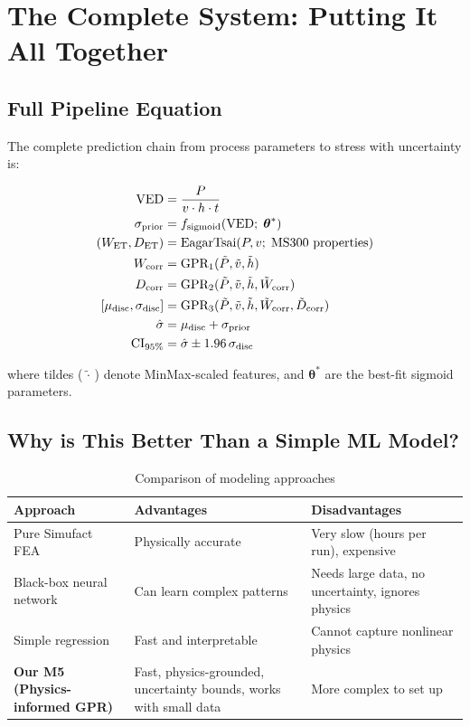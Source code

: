 \documentclass[12pt,a4paper]{report}
\begin{document}
\chapter{The Complete System: Putting It All Together}

\section{Full Pipeline Equation}

The complete prediction chain from process parameters to stress with uncertainty is:

\begin{align}
\text{VED} &= \frac{P}{v \cdot h \cdot t} \notag\\
\sigma_{\text{prior}} &= f_{\text{sigmoid}}(\text{VED};\; \boldsymbol{\theta}^*) \notag\\
(W_{\text{ET}}, D_{\text{ET}}) &= \text{EagarTsai}(P, v;\; \text{MS300 properties}) \notag\\
W_{\text{corr}} &= \text{GPR}_1(\tilde{P}, \tilde{v}, \tilde{h}) \notag\\
D_{\text{corr}} &= \text{GPR}_2(\tilde{P}, \tilde{v}, \tilde{h}, \tilde{W}_{\text{corr}}) \notag\\
[\mu_{\text{disc}}, \sigma_{\text{disc}}] &= \text{GPR}_3(\tilde{P}, \tilde{v}, \tilde{h}, \tilde{W}_{\text{corr}}, \tilde{D}_{\text{corr}}) \notag\\
\hat{\sigma} &= \mu_{\text{disc}} + \sigma_{\text{prior}} \notag\\
\text{CI}_{95\%} &= \hat{\sigma} \pm 1.96\,\sigma_{\text{disc}}
\end{align}

where tildes ($\tilde{\,\cdot\,}$) denote MinMax-scaled features, and $\boldsymbol{\theta}^*$ are the best-fit sigmoid parameters.

\section{Why is This Better Than a Simple ML Model?}

\begin{table}[h!]
\centering
\caption{Comparison of modeling approaches}
\begin{tabular}{@{}p{3.5cm}p{3.5cm}p{4cm}@{}}
\toprule
\textbf{Approach} & \textbf{Advantages} & \textbf{Disadvantages} \\
\midrule
Pure Simufact FEA & Physically accurate & Very slow (hours per run), expensive \\
\midrule
Black-box neural network & Can learn complex patterns & Needs large data, no uncertainty, ignores physics \\
\midrule
Simple regression & Fast and interpretable & Cannot capture nonlinear physics \\
\midrule
\textbf{Our M5 (Physics-informed GPR)} & Fast, physics-grounded, uncertainty bounds, works with small data & More complex to set up \\
\bottomrule
\end{tabular}
\end{table}
\end{document}
